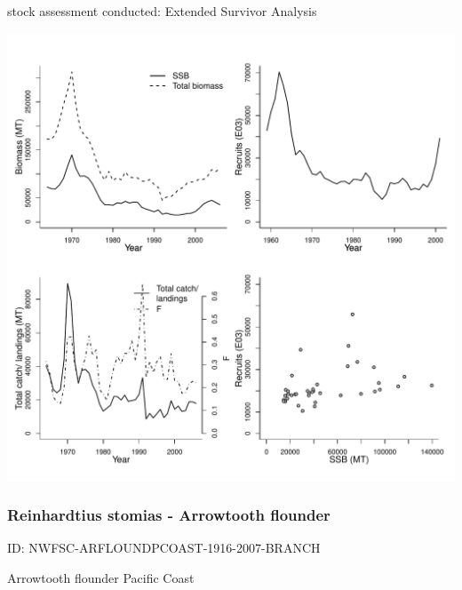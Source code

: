 stock assessment conducted: Extended Survivor Analysis 
\begin{center}
\vspace{-0.2cm}\includegraphics[scale=0.65]{../tex/figures/plot-AFWG-GHALNEAR-1959-2007-JENNINGS.pdf}
\end{center}

\newpage
\subsubsection{Reinhardtius stomias - Arrowtooth flounder}
ID: NWFSC-ARFLOUNDPCOAST-1916-2007-BRANCH

Arrowtooth flounder Pacific Coast 

